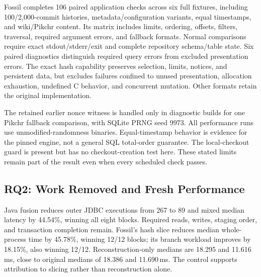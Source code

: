 \documentclass[acmsmall,screen,review,anonymous]{acmart}
\begin{document}
Fossil completes 106 paired application checks across six full fixtures,
including 100/2,000-commit histories, metadata/configuration variants, equal
timestamps, and wiki/Pikchr content. Its matrix includes limits, ordering,
offsets, filters, traversal, required argument errors, and fallback formats.
Normal comparisons require exact stdout/stderr/exit and complete repository
schema/table state. Six paired diagnostics distinguish required query errors
from excluded presentation errors. The exact hash capability preserves
selection, limits, notices, and persistent data, but excludes failures confined
to unused presentation, allocation exhaustion, undefined C behavior, and
concurrent mutation. Other formats retain the original implementation.

The retained earlier nonce witness is handled only in diagnostic builds for
one Pikchr fallback comparison, with SQLite PRNG seed 9973. All performance
runs use unmodified-randomness binaries. Equal-timestamp behavior is evidence
for the pinned engine, not a general SQL total-order guarantee. The local-checkout
guard is present but has no checkout-creation test here. These stated limits
remain part of the result even when every scheduled check passes.

\subsection{RQ2: Work Removed and Fresh Performance}
\begin{table}[t]
\caption{Fresh five-subject results: arm medians in milliseconds, original/tested
median ratio, and paired wins. ``Experimental'' rows are not framework-admitted
speedups; alf.io is identical-code A/A variation. Fossil has two workloads.
Different timing boundaries are not pooled.}
\label{tab:performance}
\small\PrimaryResults
\end{table}

Java fusion reduces outer JDBC executions from 267 to 89 and mixed median
latency by 44.54\%, winning all eight blocks. Required reads, writes, staging
order, and transaction completion remain. Fossil's hash slice reduces median
whole-process time by 45.78\%, winning 12/12 blocks; its branch workload improves
by 18.15\%, also winning 12/12. Reconstruction-only medians are 18.295 and
11.616\,ms, close to original medians of 18.386 and 11.690\,ms. The control
supports attribution to slicing rather than reconstruction alone.

\begin{table}[t]
\caption{Fresh Java deletion/fusion factorial. Eight blocks per arm preserve
identical full data and requests. Component medians are not additive.}
\label{tab:composition}
\small\JavaCompositionResults
\end{table}
\end{document}
